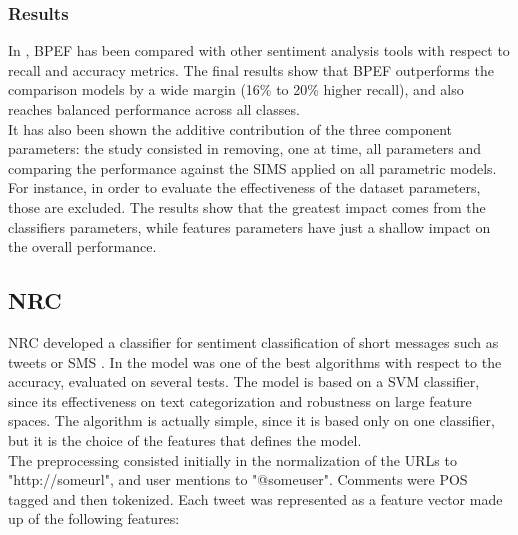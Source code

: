 \subsubsection{Results}

In \cite{Hassan2013TwitterSA}, \ac{BPEF} has been compared with other sentiment analysis tools with respect to recall and accuracy metrics. The final results show that \ac{BPEF} outperforms the comparison models by a wide margin (16\% to 20\% higher recall), and also reaches balanced performance across all classes.\\
It has also been shown the additive contribution of the three component parameters: the study consisted in removing, one at time, all parameters and comparing the performance against the SIMS applied on all parametric models. For instance, in order to evaluate the effectiveness of the dataset parameters, those are excluded. The results show that the greatest impact comes from the classifiers parameters, while features parameters have just a shallow impact on the overall performance.

\subsection{NRC}

\ac{NRC} developed a classifier for sentiment classification of short messages such as tweets or SMS \cite{DBLP:journals/corr/MohammadKZ13}. In \cite{Zimbra:2018:STS:3210372.3185045} the model was one of the best algorithms with respect to the accuracy, evaluated on several tests. The model is based on a \ac{SVM} classifier, since its effectiveness on text categorization and robustness on large feature spaces. The algorithm is actually simple, since it is based only on one classifier, but it is the choice of the features that defines the model.\\
The preprocessing consisted initially in the normalization of the URLs to "http://someurl", and user mentions to "@someuser". Comments were \ac{POS} tagged and then tokenized. Each tweet was represented as a feature vector made up of the following features:

